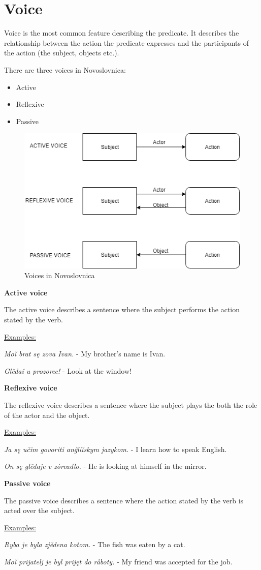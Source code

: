 \section{Voice}

Voice is the most common feature describing the predicate. It describes the relationship between the action the predicate expresses and the participants of the action (the subject, objects etc.).

There are three voices in Novoslovnica:

\begin{itemize}
	\item Active
	\item Reflexive
	\item Passive
\end{itemize}

\begin{figure}
	\includegraphics[width=\linewidth]{./sources/voices.png}
	\caption{Voices in Novoslovnica}
	\label{fig:voices}
\end{figure}

\textbf{Active voice}

The active voice describes a sentence where the subject performs the action stated by the verb.

\underline{Examples:}

\textit{Moǐ brat sę zova Ivan.} - My brother's name is Ivan.

\textit{Glědaǐ u prozorec!} - Look at the window!

\textbf{Reflexive voice}

The reflexive voice describes a sentence where the subject plays the both the role of the actor and the object.

\underline{Examples:}

\textit{Ja sę učim govoriti anĝliǐskym jazykom.} - I learn how to speak English.

\textit{On sę glědaje v zòrcadlo.} - He is looking at himself in the mirror.

\textbf{Passive voice}

The passive voice describes a sentence where the action stated by the verb is acted over the subject.

\underline{Examples:}

\textit{Ryba je byla zjědena kotom.} - The fish was eaten by a cat.

\textit{Moǐ prijatelj je byl prijęt do råboty.} - My friend was accepted for the job.